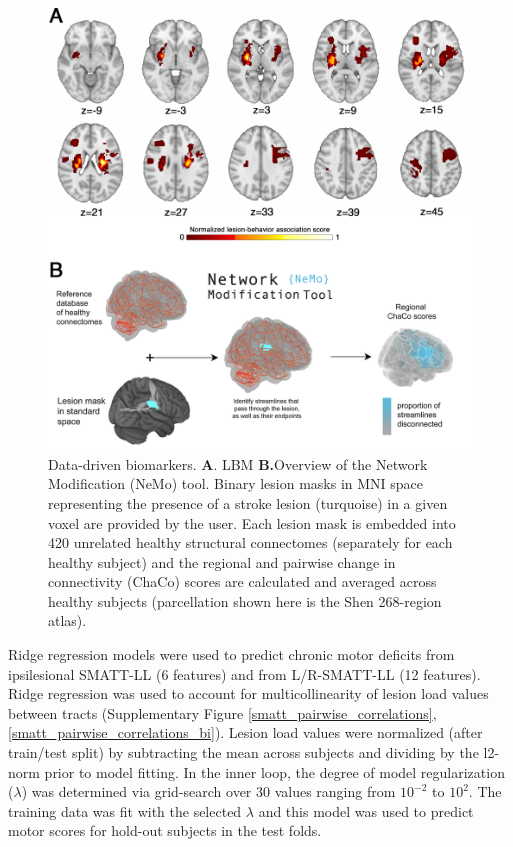 \documentclass[10pt]{article}
\begin{document}
\begin{figure}[htp]
\centering
\includegraphics[width=1\linewidth]{figures/data_driven.png}
\caption{Data-driven biomarkers. \textbf{A}. LBM \textbf{B.}Overview of the Network Modification (NeMo) tool. Binary lesion masks in MNI space representing the presence of a stroke lesion (turquoise) in a given voxel are provided by the user. Each lesion mask is embedded into 420 unrelated healthy structural connectomes (separately for each healthy subject) and the regional and pairwise change in connectivity (ChaCo) scores are calculated and averaged across healthy subjects (parcellation shown here is the Shen 268-region atlas). }
\label{M1}
\end{figure}




Ridge regression models were used to predict chronic motor deficits from ipsilesional SMATT-LL (6 features) and from L/R-SMATT-LL (12 features). Ridge regression was used to account for multicollinearity of lesion load values between tracts (Supplementary Figure \ref{smatt_pairwise_correlations}, \ref{smatt_pairwise_correlations_bi}). Lesion load values were normalized (after train/test split) by subtracting the mean across subjects and dividing by the l2-norm prior to model fitting. In the inner loop, the degree of model regularization  ($\lambda$) was determined via grid-search over 30 values ranging from $10^{-2}$ to $10^2$. The training data was fit with the selected $\lambda$ and this model was used to predict motor scores for hold-out subjects in the test folds.
\end{document}
